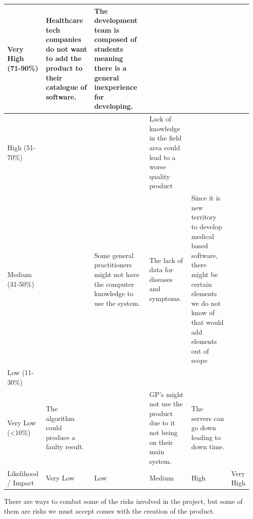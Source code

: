 \begin{center}
	\centering
	\begin{tabular}[h]{|p{4em}|p{6em}|p{6em}|p{6em}|p{6em}|p{6em}|}
		\hline
		Very High (71-90\%)  &  Healthcare tech companies do not want to add the product to their catalogue of software. &         The development team is composed of students meaning there is a general inexperience for developing. & & &                                                                     \\ \hline                                                                                                                                                                                                                                                
		High   (51-70\%)   & & & Lack of knowledge in the field area could lead to a worse quality product & & \\ \hline
		Medium (31-50\%)  & & Some general practitioners might not have the computer knowledge to use the system. & The lack of data for diseases and symptoms. & Since it is new territory to develop medical based software, there might be certain elements we do not know of that would add elements out of scope & \\ \hline
		Low   (11-30\%)   & & & & & \\ \hline
		Very Low (<10\%) & The algorithm could produce a faulty result. & & GP’s might not use the product due to it not being on their main system. & The servers can go down leading to down time. & \\ \hline
		Likelihood / Impact & Very Low & Low & Medium & High & Very High \\ \hline
	\end{tabular}
\end{center} 
\pagebreak
There are ways to combat some of the risks involved in the project, but some of them are risks we must accept comes with the creation of the product.

